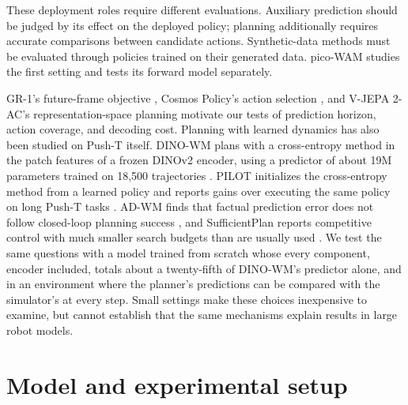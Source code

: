 \documentclass[11pt]{article}
\begin{document}
These deployment roles require different evaluations. Auxiliary prediction should be judged by its effect on the deployed policy; planning additionally requires accurate comparisons between candidate actions. Synthetic-data methods must be evaluated through policies trained on their generated data. pico-WAM studies the first setting and tests its forward model separately.

GR-1's future-frame objective \citep{wu2023gr1}, Cosmos Policy's action selection \citep{kim2026cosmospolicy}, and V-JEPA 2-AC's representation-space planning \citep{assran2025vjepa2} motivate our tests of prediction horizon, action coverage, and decoding cost. Planning with learned dynamics has also been studied on Push-T itself. DINO-WM plans with a cross-entropy method in the patch features of a frozen DINOv2 encoder, using a predictor of about 19M parameters trained on 18,500 trajectories \citep{zhou2024dinowm}. PILOT initializes the cross-entropy method from a learned policy and reports gains over executing the same policy on long Push-T tasks \citep{liu2026pilot}. AD-WM finds that factual prediction error does not follow closed-loop planning success \citep{qiu2026adwm}, and SufficientPlan reports competitive control with much smaller search budgets than are usually used \citep{li2026sufficientplan}. We test the same questions with a model trained from scratch whose every component, encoder included, totals about a twenty-fifth of DINO-WM's predictor alone, and in an environment where the planner's predictions can be compared with the simulator's at every step. Small settings make these choices inexpensive to examine, but cannot establish that the same mechanisms explain results in large robot models.

\section{Model and experimental setup}
\label{sec:build}
\end{document}
